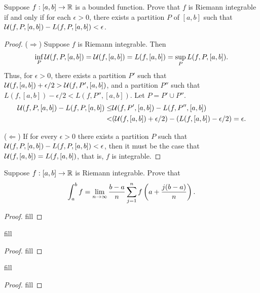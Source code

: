\begin{exercise}{3}
Suppose $f:[a,b]\to\mathbb{R}$ is a bounded function. 
Prove that $f$ is Riemann integrable if and only if for each $\epsilon>0$, there exists a partition $P$ of $[a,b]$ such that $\mathcal{U}(f,P,[a,b]) - L(f,P,[a,b]) < \epsilon$.
\end{exercise}
\begin{proof}
($\Rightarrow$)
Suppose $f$ is Riemann integrable.
Then 
\begin{align*}
    \inf_P \mathcal{U}(f,P,[a,b]) = \mathcal{U}(f,[a,b]) = L(f,[a,b]) = \sup_P L(f,P,[a,b]).
\end{align*}
Thus, for $\epsilon>0$, there exists a partition $P'$ such that $\mathcal{U}(f,[a,b]) + \epsilon/2 > \mathcal{U}(f,P',[a,b])$, and a partition $P''$ such that $L(f,[a,b]) - \epsilon/2 < L(f,P'',[a,b])$.
Let $P = P' \cup P''$.
\begin{align*}
    \mathcal{U}(f,P,[a,b]) - L(f,P,[a,b]) 
    \leq& \mathcal{U}(f,P',[a,b]) - L(f,P'',[a,b])\\
    <& (\mathcal{U}(f,[a,b]) + \epsilon/2) 
    - (L(f,[a,b]) - \epsilon/2) = \epsilon.
\end{align*}

($\Leftarrow$)
If for every $\epsilon>0$ there exists a partition $P$ such that  $\mathcal{U}(f,P,[a,b]) - L(f,P,[a,b]) < \epsilon$, then it must be the case that $\mathcal{U}(f,[a,b]) = L(f,[a,b])$, that is, $f$ is integrable.
\end{proof} 

\begin{exercise}{8}
Suppose $f:[a,b]\to\mathbb{R}$ is Riemann integrable.
Prove that 
\begin{align*}
    \int_a^b f = \lim_{n\to\infty} \frac{b-a}{n}\sum_{j=1}^n f\left( a+\frac{j(b-a)}{n}\right).
\end{align*}
\end{exercise}
\begin{proof}
fill
\end{proof} 

\begin{exercise}{13}
fill
\end{exercise}
\begin{proof}
fill
\end{proof} 

\begin{exercise}{14}
fill
\end{exercise}
\begin{proof}
fill
\end{proof} 
